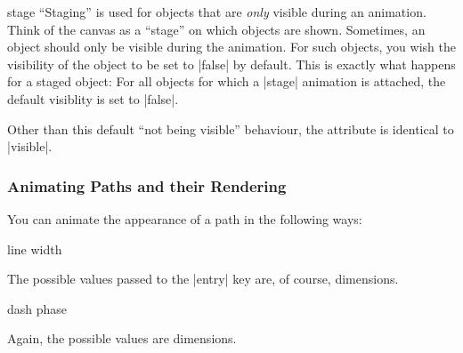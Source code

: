 \begin{animateattribute}{stage}
  ``Staging'' is used for objects that are \emph{only} visible during
  an animation. Think of the canvas as a ``stage'' on which objects
  are shown. Sometimes, an object should only be visible during the
  animation. For such objects, you wish the visibility of the object
  to be set to |false| by default. This is exactly what happens for a
  staged object: For all objects for which a |stage| animation is
  attached, the default visiblity is set to |false|.

  Other than this default ``not being visible'' behaviour, the
  attribute is identical to |visible|. 

\begin{codeexample}[width=4cm]
\end{codeexample}
\end{animateattribute}


\subsubsection{Animating Paths and their Rendering}
\label{section-base-animation-paths}

You can animate the appearance of a path in the following ways:

\begin{animateattribute}{line width}
\begin{codeexample}[width=2.3cm]
\end{codeexample}
  The possible values passed to the |entry| key are, of course,
  dimensions. 
\end{animateattribute}

\begin{animateattribute}{dash phase}
\begin{codeexample}[width=2.3cm]
\end{codeexample}
  Again, the possible values are dimensions.
\end{animateattribute}

